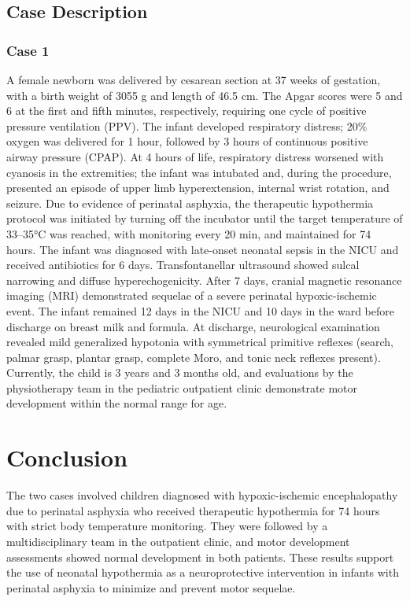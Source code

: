 \documentclass[11pt,a4paper]{article}
\begin{document}
	\subsection{Case Description}
	\subsubsection{Case 1}
	A female newborn was delivered by cesarean section at 37 weeks of gestation, with a birth weight of 3055 g and length of 46.5 cm. The Apgar scores were 5 and 6 at the first and fifth minutes, respectively, requiring one cycle of positive pressure ventilation (PPV). The infant developed respiratory distress; 20\% oxygen was delivered for 1 hour, followed by 3 hours of continuous positive airway pressure (CPAP). At 4 hours of life, respiratory distress worsened with cyanosis in the extremities; the infant was intubated and, during the procedure, presented an episode of upper limb hyperextension, internal wrist rotation, and seizure. Due to evidence of perinatal asphyxia, the therapeutic hypothermia protocol was initiated by turning off the incubator until the target temperature of 33--35°C was reached, with monitoring every 20 min, and maintained for 74 hours. The infant was diagnosed with late-onset neonatal sepsis in the NICU and received antibiotics for 6 days. Transfontanellar ultrasound showed sulcal narrowing and diffuse hyperechogenicity. After 7 days, cranial magnetic resonance imaging (MRI) demonstrated sequelae of a severe perinatal hypoxic-ischemic event. The infant remained 12 days in the NICU and 10 days in the ward before discharge on breast milk and formula. At discharge, neurological examination revealed mild generalized hypotonia with symmetrical primitive reflexes (search, palmar grasp, plantar grasp, complete Moro, and tonic neck reflexes present). Currently, the child is 3 years and 3 months old, and evaluations by the physiotherapy team in the pediatric outpatient clinic demonstrate motor development within the normal range for age.
		
	\section{Conclusion}
	The two cases involved children diagnosed with hypoxic-ischemic encephalopathy due to perinatal asphyxia who received therapeutic hypothermia for 74 hours with strict body temperature monitoring. They were followed by a multidisciplinary team in the outpatient clinic, and motor development assessments showed normal development in both patients. These results support the use of neonatal hypothermia as a neuroprotective intervention in infants with perinatal asphyxia to minimize and prevent motor sequelae.
	
	\newpage
	
	\printbibliography[title=References]
		
\end{document}
